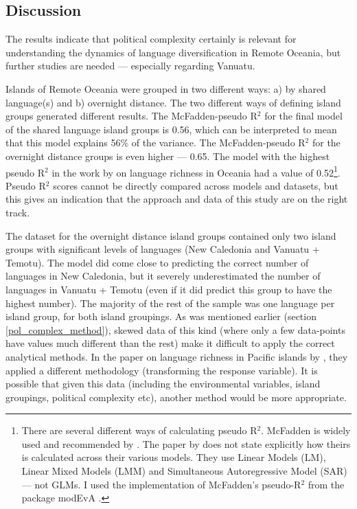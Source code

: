 \documentclass[a4paper,10pt]{article} %
\begin{document}
\subsection{Discussion}
\label{pol_study_discisson}
The results indicate that political complexity certainly is relevant for understanding the dynamics of language diversification in Remote Oceania, but further studies are needed --- especially regarding Vanuatu.

Islands of Remote Oceania were grouped in two different ways: a) by shared language(s) and b) overnight distance. The two different ways of defining island groups generated different results. The McFadden-pseudo R$^2$ \citep{mcfadden1974frontiers} for the final model of the shared language island groups is 0.56, which can be interpreted to mean that this model explains 56\% of the variance. The McFadden-pseudo R$^2$ for the overnight distance groups is even higher ---  0.65. The model with the highest pseudo R$^2$ in the work by \citet{gavin2012island} on language richness in Oceania had a value of 0.52\footnote{There are several different ways of calculating pseudo R$^2$. McFadden is widely used and recommended by \citet{allison2014measures}. The paper by \citet{gavin2012island} does not state explicitly how theirs is calculated across their various models. They use Linear Models (LM), Linear Mixed Models (LMM) and Simultaneous Autoregressive Model (SAR) --- not GLMs. I used the implementation of McFadden's pseudo-R$^2$ from the package modEvA \citep{barbosa2016package}.}. Pseudo R$^2$ scores cannot be directly compared across models and datasets, but this gives an indication that the approach and data of this study are on the right track.

The dataset for the overnight distance island groups contained only two island groups with significant levels of languages (New Caledonia and Vanuatu + Temotu). The model did come close to predicting the correct number of languages in New Caledonia, but it severely underestimated the number of languages in Vanuatu + Temotu (even if it did predict this group to have the highest number). The majority of the rest of the sample was one language per island group, for both island groupings. As was mentioned earlier (section \ref{pol_complex_method}), skewed data of this kind (where only a few data-points have values much different than the rest) make it difficult to apply the correct analytical methods. In the paper on language richness in Pacific islands by \cite{gavin2012island}, they applied a different methodology (transforming the response variable). It is possible that given this data (including the environmental variables, island groupings, political complexity etc), another method would be more appropriate.
\end{document}
